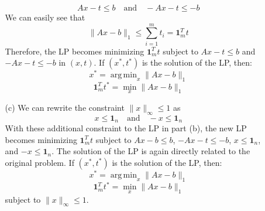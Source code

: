 \documentclass{article}
\DeclareMathOperator*{\argmin}{arg\,min}
\begin{document}
\begin{itemize}
\begin{itemize}
    \[ Ax - t \le b \quad \text{and} \quad -Ax - t \le -b \]
    We can easily see that
    \[ \|Ax - b\|_1 \le \sum_{i=1}^m t_i = \mathbf{1}_m^T t \]
    Therefore, the LP becomes minimizing $\mathbf{1}_m^T t$ subject to $Ax - t \le b$ and $-Ax - t \le -b$ in $(x, t)$.
    If $(x^*, t^*)$ is the solution of the LP, then:
    \[ x^* = \argmin_x \|Ax - b\|_1 \]
    \[ \mathbf{1}_m^T t^* = \min_x \|Ax - b\|_1 \]
    \item[(c)] We can rewrite the constraint $\|x\|_\infty \le 1$ as
    \[ x \le \mathbf{1}_n \quad \text{and} \quad -x \le \mathbf{1}_n \]
    With these additional constraint to the LP in part (b), the new LP becomes minimizing $\mathbf{1}_m^T t$ subject to $Ax -b \le b$, $-Ax - t \le -b$, $x \le \mathbf{1}_n$, and $-x \le \mathbf{1}_n$.
    The solution of the LP is again directly related to the original problem. If $(x^*, t^*)$ is the solution of the LP, then:
    \[ x^* = \argmin_x \|Ax - b\|_1 \]
    \[ \mathbf{1}_m^T t^* = \min_x \|Ax - b\|_1 \]
    subject to $\|x\|_\infty \le 1$.
  \end{itemize}
\end{itemize}
\end{document}

